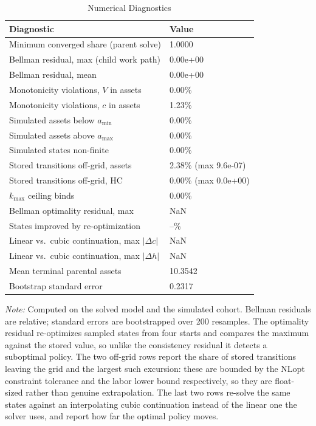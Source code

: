 \begin{table}[H]
    \centering
    \begin{threeparttable}
    \caption{Numerical Diagnostics}
    \label{tab:numerical_diagnostics}
    \begin{tabular}{p{8cm} p{4cm}}
        \toprule\toprule
        \textbf{Diagnostic} & \textbf{Value} \\
        \midrule
        Minimum converged share (parent solve) & 1.0000 \\
        Bellman residual, max (child work path) & 0.00e+00 \\
        Bellman residual, mean & 0.00e+00 \\
        Monotonicity violations, $V$ in assets & 0.00\% \\
        Monotonicity violations, $c$ in assets & 1.23\% \\
        Simulated assets below $a_{\min}$ & 0.00\% \\
        Simulated assets above $a_{\max}$ & 0.00\% \\
        Simulated states non-finite & 0.00\% \\
        Stored transitions off-grid, assets & 2.38\% (max 9.6e-07) \\
        Stored transitions off-grid, HC & 0.00\% (max 0.0e+00) \\
        $k_{\max}$ ceiling binds & 0.00\% \\
        Bellman optimality residual, max & NaN \\
        States improved by re-optimization & --\% \\
        Linear vs.\ cubic continuation, max $|\Delta c|$ & NaN \\
        Linear vs.\ cubic continuation, max $|\Delta h|$ & NaN \\
        Mean terminal parental assets & 10.3542 \\
        Bootstrap standard error & 0.2317 \\
        \bottomrule\bottomrule
    \end{tabular}
    \begin{tablenotes}
        \footnotesize
        \item \textit{Note:} Computed on the solved model and the simulated cohort. Bellman residuals are relative; standard errors are bootstrapped over 200 resamples. The optimality residual re-optimizes sampled states from four starts and compares the maximum against the stored value, so unlike the consistency residual it detects a suboptimal policy. The two off-grid rows report the share of stored transitions leaving the grid and the largest such excursion: these are bounded by the NLopt constraint tolerance and the labor lower bound respectively, so they are float-sized rather than genuine extrapolation. The last two rows re-solve the same states against an interpolating cubic continuation instead of the linear one the solver uses, and report how far the optimal policy moves.
    \end{tablenotes}
    \end{threeparttable}
\end{table}
